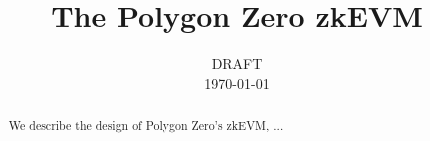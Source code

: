 \documentclass[12pt]{article}
\title{The Polygon Zero zkEVM}
\date{DRAFT\\\today}
\begin{document}
\maketitle

\begin{abstract}
  We describe the design of Polygon Zero's zkEVM, ...
\end{abstract}

\newpage
{\hypersetup{hidelinks} \tableofcontents}
\newpage







{}

\end{document}
